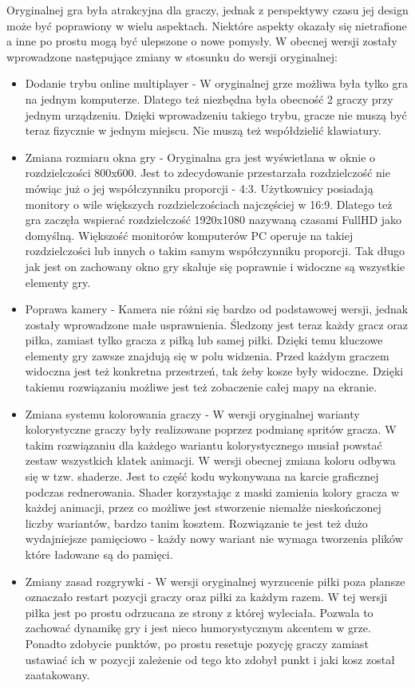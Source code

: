 \documentclass[a4paper,12pt,twoside,openany]{report}
\begin{document}
Oryginalnej gra była atrakcyjna dla graczy, jednak z perspektywy czasu jej design może być poprawiony w wielu aspektach. Niektóre aspekty okazały się nietrafione a inne po prostu mogą być ulepszone o nowe pomysły. W obecnej wersji zostały wprowadzone następujące zmiany w stosunku do wersji oryginalnej:
\begin{itemize}
    \item Dodanie trybu online multiplayer - W oryginalnej grze możliwa była tylko gra na jednym komputerze. Dlatego też niezbędna była obecność 2 graczy przy jednym urządzeniu. Dzięki wprowadzeniu takiego trybu, gracze nie muszą być teraz fizycznie w jednym miejscu. Nie muszą też współdzielić klawiatury.
    \item Zmiana rozmiaru okna gry - Oryginalna gra jest wyświetlana w oknie o rozdzielczości 800x600. Jest to zdecydowanie przestarzała rozdzielczość nie mówiąc już o jej współczynniku proporcji - 4:3. Użytkownicy posiadają monitory o wile większych rozdzielczościach najczęściej w 16:9. Dlatego też gra zaczęła wspierać rozdzielczość 1920x1080  nazywaną czasami FullHD jako domyślną. Większość monitorów komputerów PC operuje na takiej rozdzielczości lub innych o takim samym współczynniku proporcji. Tak długo jak jest on zachowany okno gry skaluje się poprawnie i widoczne są wszystkie elementy gry.
    \item Poprawa kamery - Kamera nie różni się bardzo od podstawowej wersji, jednak zostały wprowadzone małe usprawnienia. Śledzony jest teraz każdy gracz oraz piłka, zamiast tylko gracza z piłką lub samej piłki. Dzięki temu kluczowe elementy gry zawsze znajdują się w polu widzenia. Przed każdym graczem widoczna jest też konkretna przestrzeń, tak żeby kosze były widoczne. Dzięki takiemu rozwiązaniu możliwe jest też zobaczenie całej mapy na ekranie.  
    \item Zmiana systemu kolorowania graczy - W wersji oryginalnej warianty kolorystyczne graczy były realizowane poprzez podmianę spritów gracza. W takim rozwiązaniu dla każdego wariantu kolorystycznego musiał powstać zestaw wszystkich klatek animacji. W wersji obecnej zmiana koloru odbywa się w tzw. shaderze. Jest to część kodu wykonywana na karcie graficznej podczas rednerowania. Shader korzystając z maski zamienia kolory gracza w każdej animacji, przez co możliwe jest stworzenie niemalże nieskończonej liczby wariantów, bardzo tanim kosztem. Rozwiązanie te jest też dużo wydajniejsze pamięciowo - każdy nowy wariant nie wymaga tworzenia plików które ładowane są do pamięci.
    \item Zmiany zasad rozgrywki - W wersji oryginalnej wyrzucenie piłki poza plansze oznaczało restart pozycji graczy oraz piłki za każdym razem. W tej wersji piłka jest po prostu odrzucana ze strony z której wyleciała. Pozwala to zachować dynamikę gry i jest nieco humorystycznym akcentem w grze. Ponadto zdobycie punktów, po prostu resetuje pozycję graczy zamiast ustawiać ich w pozycji zależenie od tego kto zdobył punkt i jaki kosz został zaatakowany.

\end{itemize}
\end{document}
